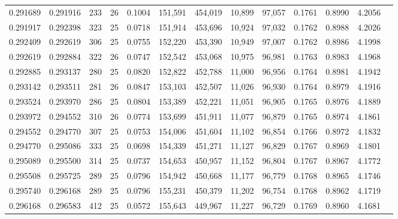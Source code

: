 \begin{tabular}{rrrrrrrrrrrrr}
0.291689 & 0.291916 &   233 &  26 &                                     0.1004 & 151,591 & 454,019 &  10,899 &  97,057 & 0.1761 & 0.8990 & 4.2056 \\
0.291917 & 0.292398 &   323 &  25 &                                     0.0718 & 151,914 & 453,696 &  10,924 &  97,032 & 0.1762 & 0.8988 & 4.2026 \\
0.292409 & 0.292619 &   306 &  25 &                                     0.0755 & 152,220 & 453,390 &  10,949 &  97,007 & 0.1762 & 0.8986 & 4.1998 \\
0.292619 & 0.292884 &   322 &  26 &                                     0.0747 & 152,542 & 453,068 &  10,975 &  96,981 & 0.1763 & 0.8983 & 4.1968 \\
0.292885 & 0.293137 &   280 &  25 &                                     0.0820 & 152,822 & 452,788 &  11,000 &  96,956 & 0.1764 & 0.8981 & 4.1942 \\
0.293142 & 0.293511 &   281 &  26 &                                     0.0847 & 153,103 & 452,507 &  11,026 &  96,930 & 0.1764 & 0.8979 & 4.1916 \\
0.293524 & 0.293970 &   286 &  25 &                                     0.0804 & 153,389 & 452,221 &  11,051 &  96,905 & 0.1765 & 0.8976 & 4.1889 \\
0.293972 & 0.294552 &   310 &  26 &                                     0.0774 & 153,699 & 451,911 &  11,077 &  96,879 & 0.1765 & 0.8974 & 4.1861 \\
0.294552 & 0.294770 &   307 &  25 &                                     0.0753 & 154,006 & 451,604 &  11,102 &  96,854 & 0.1766 & 0.8972 & 4.1832 \\
0.294770 & 0.295086 &   333 &  25 &                                     0.0698 & 154,339 & 451,271 &  11,127 &  96,829 & 0.1767 & 0.8969 & 4.1801 \\
0.295089 & 0.295500 &   314 &  25 &                                     0.0737 & 154,653 & 450,957 &  11,152 &  96,804 & 0.1767 & 0.8967 & 4.1772 \\
0.295508 & 0.295725 &   289 &  25 &                                     0.0796 & 154,942 & 450,668 &  11,177 &  96,779 & 0.1768 & 0.8965 & 4.1746 \\
0.295740 & 0.296168 &   289 &  25 &                                     0.0796 & 155,231 & 450,379 &  11,202 &  96,754 & 0.1768 & 0.8962 & 4.1719 \\
0.296168 & 0.296583 &   412 &  25 &                                     0.0572 & 155,643 & 449,967 &  11,227 &  96,729 & 0.1769 & 0.8960 & 4.1681 \\

\end{tabular}
